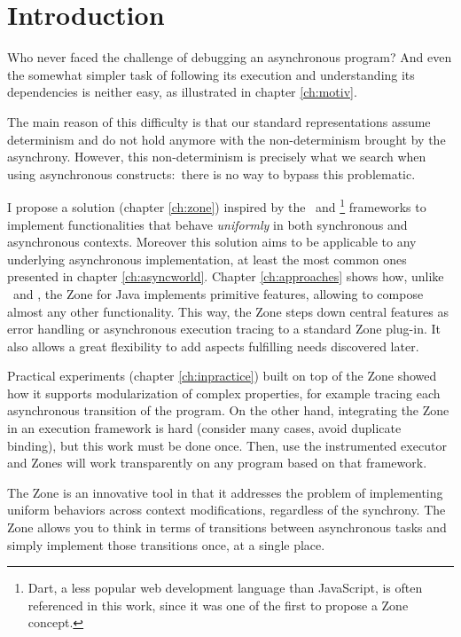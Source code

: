 
\chapter{Introduction}
\label{ch:intro}

Who never faced the challenge of debugging an asynchronous program? And even the somewhat simpler task of following its execution and understanding its dependencies is neither easy, as illustrated in chapter \ref{ch:motiv}.

The main reason of this difficulty is that our standard representations assume determinism and do not hold anymore with the non-determinism brought by the asynchrony.
However, this non-determinism is precisely what we search when using asynchronous constructs:~there is no way to bypass this problematic.

I propose a solution (chapter \ref{ch:zone}) inspired by the \zonejs\ and \zonedrt\footnote{Dart, a less popular web development language than JavaScript, is often referenced in this work, since it was one of the first to propose a Zone concept.} frameworks to implement functionalities that behave \emph{uniformly} in both synchronous and asynchronous contexts. Moreover this solution aims to be applicable to any underlying asynchronous implementation, at least the most common ones presented in chapter \ref{ch:asyncworld}. Chapter \ref{ch:approaches} shows how, unlike \zonejs\ and \zonedrt, the Zone for Java implements primitive features, allowing to compose almost any other functionality. This way, the Zone steps down central features as error handling or asynchronous execution tracing to a standard Zone plug-in. It also allows a great flexibility to add aspects fulfilling needs discovered later.

Practical experiments (chapter \ref{ch:inpractice}) built on top of the Zone showed how it supports modularization of complex properties, for example tracing each asynchronous transition of the program. On the other hand, integrating the Zone in an execution framework is hard (consider many cases, avoid duplicate binding), but this work must be done once. Then, use the instrumented executor and Zones will work transparently on any program based on that framework.

The Zone is an innovative tool in that it addresses the problem of implementing uniform behaviors across context modifications, regardless of the synchrony. The Zone allows you to think in terms of transitions between asynchronous tasks and simply implement those transitions once, at a single place.










